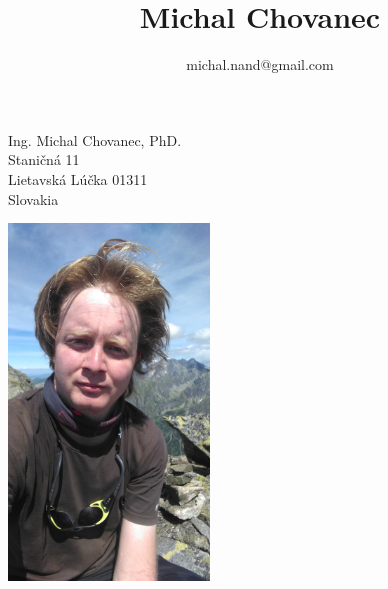 \documentclass[10pt]{article}
\title{\bfseries\Huge Michal Chovanec}
\author{michal.nand@gmail.com}
\date{}
\begin{document}
\maketitle





\begin{minipage}{0.5\textwidth}

	Ing. Michal Chovanec, PhD. \\
	Staničná 11\\
	Lietavská Lúčka 01311\\
	Slovakia

\end{minipage} \hfill
\begin{minipage}{0.45\textwidth}

	\begin{flushright}
	\includegraphics[width=0.4\textwidth]{photo.jpg}
	\end{flushright}

\end{minipage}
\end{document}
